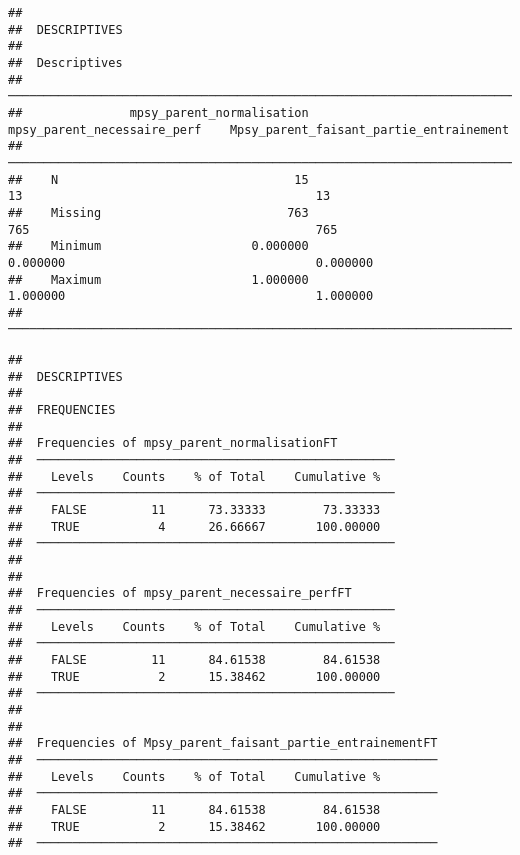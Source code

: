 \documentclass[
]{article}
\begin{document}
\begin{verbatim}
## 
##  DESCRIPTIVES
## 
##  Descriptives                                                                                                       
##  ────────────────────────────────────────────────────────────────────────────────────────────────────────────────── 
##               mpsy_parent_normalisation    mpsy_parent_necessaire_perf    Mpsy_parent_faisant_partie_entrainement   
##  ────────────────────────────────────────────────────────────────────────────────────────────────────────────────── 
##    N                                 15                             13                                         13   
##    Missing                          763                            765                                        765   
##    Minimum                     0.000000                       0.000000                                   0.000000   
##    Maximum                     1.000000                       1.000000                                   1.000000   
##  ──────────────────────────────────────────────────────────────────────────────────────────────────────────────────
\end{verbatim}

\begin{verbatim}
## 
##  DESCRIPTIVES
## 
##  FREQUENCIES
## 
##  Frequencies of mpsy_parent_normalisationFT         
##  ────────────────────────────────────────────────── 
##    Levels    Counts    % of Total    Cumulative %   
##  ────────────────────────────────────────────────── 
##    FALSE         11      73.33333        73.33333   
##    TRUE           4      26.66667       100.00000   
##  ────────────────────────────────────────────────── 
## 
## 
##  Frequencies of mpsy_parent_necessaire_perfFT       
##  ────────────────────────────────────────────────── 
##    Levels    Counts    % of Total    Cumulative %   
##  ────────────────────────────────────────────────── 
##    FALSE         11      84.61538        84.61538   
##    TRUE           2      15.38462       100.00000   
##  ────────────────────────────────────────────────── 
## 
## 
##  Frequencies of Mpsy_parent_faisant_partie_entrainementFT 
##  ──────────────────────────────────────────────────────── 
##    Levels    Counts    % of Total    Cumulative %   
##  ──────────────────────────────────────────────────────── 
##    FALSE         11      84.61538        84.61538   
##    TRUE           2      15.38462       100.00000   
##  ────────────────────────────────────────────────────────
\end{verbatim}
\end{document}
